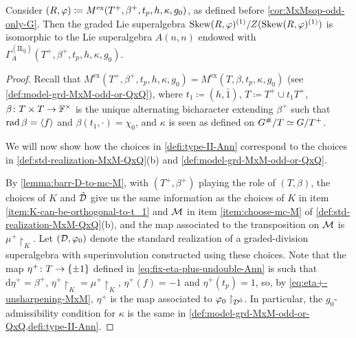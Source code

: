 \begin{prop}\label{prop:Ann-Type-II-correspondence}
    Consider $(R, \varphi) \coloneqq M^{\mathrm{ex}}(T^+, \beta^+, t_p, h, \kappa, g_0)$, as defined before \cref{cor:MxMsop-odd-only-G}. 
    Then the graded Lie superalgebra $\operatorname{Skew} (R,\varphi)^{(1)}/Z(\operatorname{Skew} (R,\varphi)^{(1)})$ is isomorphic to the Lie superalgebra $A(n,n)$ endowed with $\Gamma_A^{\mathrm{(II_Q)}}(T^+, \beta^+, t_p, h, \kappa, g_0)$. 
\end{prop}

\begin{proof} 
    Recall that $M^{\mathrm{ex}}(T^+, \beta^+, t_p, h, \kappa, g_0) = M^{\mathrm{ex}} (T, \beta, t_p, \kappa, g_0)$ (see \cref{def:model-grd-MxM-odd-or-QxQ}), where $t_1 \coloneqq (h, \bar 1)$, $T \coloneqq T^+ \cup t_1 T^+$, $\beta\colon T\times T \to \mathbb{F}^\times$ is the unique alternating bicharacter extending $\beta^+$ such that $\operatorname{rad} \beta = \langle f \rangle$ and $\beta(t_1, \cdot) = \chi_0$, and $\kappa$ is seen as defined on $G^\#/T \simeq G/ T^+$. 
    
    We will now show how the choices in \cref{defi:type-II-Ann}  correspond to the choices in \cref{def:std-realization-MxM-QxQ}(b) and \cref{def:model-grd-MxM-odd-or-QxQ}. 
    
    By \cref{lemma:barr-D-to-mc-M}, with $(T^+, \beta^+)$ playing the role of $(T, \beta)$, the choices of $K$ and $\tilde {\mathcal{D}}$  give us the same information as the choices of $K$ in item \eqref{item:K-can-be-orthogonal-to-t_1} and $\mathcal M$ in item \eqref{item:choose-mc-M} of \cref{def:std-realization-MxM-QxQ}(b), and the map associated to the transposition on $\mathcal M$ is $\mu^+\restriction_K$. 
    Let $(\mathcal{D}, \varphi_0)$ denote the standard realization of a graded-division superalgebra with superinvolution constructed using these choices. 
    Note that the map $\eta^+\colon T\to \{ \pm 1 \}$ defined in \cref{eq:fix-eta-plus-undouble-Ann} is such that $\mathrm{d}\eta^+ = \beta^+$, $\eta^+\restriction_{K} = \mu^+\restriction_K$, $\eta^+(f) = -1$ and $\eta^+(t_p) = 1$, so, by \cref{eq:eta+-unsharpening-MxM}, $\eta^+$ is the map associated to $\varphi_0\restriction_{\mathcal{D}^{\bar0}}$. 
    In particular, the $g_0$-admissibility condition for $\kappa$ is the same in \cref{def:model-grd-MxM-odd-or-QxQ,defi:type-II-Ann}. 
    

\end{proof}

